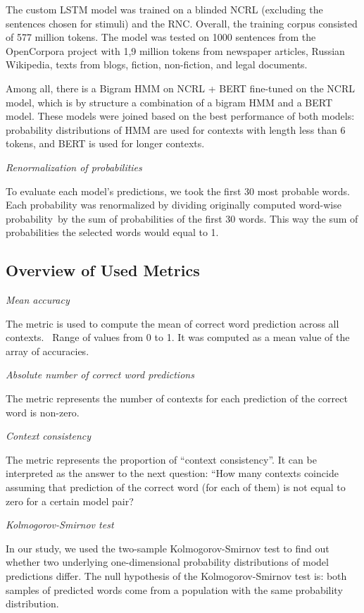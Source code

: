 \documentclass[a4paper]{article}
\newcommand{\head}[1]{\vspace{0.5em}\emph{#1}\vspace{0.25em}}
\begin{document}
The custom LSTM model was trained on a blinded NCRL (excluding the sentences chosen for stimuli) and the RNC. Overall, the training corpus consisted of 577 million tokens. The model was tested on 1000 sentences from the OpenCorpora project \cite{bocharov:2011} with 1,9 million tokens from newspaper articles, Russian Wikipedia, texts from blogs, fiction, non-fiction, and legal documents. 

Among all, there is a Bigram HMM on NCRL + BERT fine-tuned on the NCRL model, which is by structure a combination of a bigram HMM and a BERT model. These models were joined based on the best performance of both models: probability distributions of HMM are used for contexts with length less than 6 tokens, and BERT is used for longer contexts. 

\head{Renormalization of probabilities}

To evaluate each model’s predictions, we took the first 30 most probable words. Each probability was renormalized by dividing originally computed word-wise probability by the sum of probabilities of the first 30 words. This way the sum of probabilities the selected words would equal to 1.

\subsection{Overview of Used Metrics}

\head{Mean accuracy}

The metric is used to compute the mean of correct word prediction across all contexts.  Range of values from 0 to 1. It was computed as a mean value of the array of accuracies.

\head{Absolute number of correct word predictions}

The metric represents the number of contexts for each prediction of the correct word is non-zero. 

\head{Context consistency}

The metric represents the proportion of “context consistency”. It can be interpreted as the answer to the next question: “How many contexts coincide assuming that prediction of the correct word (for each of them) is not equal to zero for a certain model pair?

\head{Kolmogorov-Smirnov test}

In our study, we used the two-sample Kolmogorov-Smirnov test to find out whether two underlying one-dimensional probability distributions of model predictions differ. The null hypothesis of the Kolmogorov-Smirnov test is: both samples of predicted words come from a population with the same probability distribution. 
\end{document}
